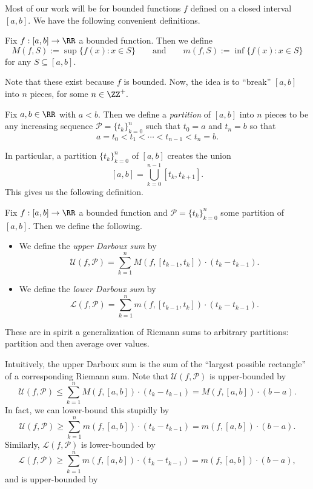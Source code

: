 \documentclass[../notes.tex]{subfiles}
\begin{document}
Most of our work will be for bounded functions $f$ defined on a closed interval $[a,b].$ We have the following convenient definitions.
\begin{definition}
	Fix $f:[a,b]\to\RR$ a bounded function. Then we define
	\[M(f,S):=\sup\{f(x):x\in S\}\qquad\text{and}\qquad m(f,S):=\inf\{f(x):x\in S\}\]
	for any $S\subseteq[a,b].$
\end{definition}
Note that these exist because $f$ is bounded. Now, the idea is to ``break'' $[a,b]$ into $n$ pieces, for some $n\in\ZZ^+.$
\begin{definition}[Partition]
	Fix $a,b\in\RR$ with $a<b.$ Then we define a \textit{partition} of $[a,b]$ into $n$ pieces to be any increasing sequence $\mathcal P=\{t_k\}_{k=0}^n$ such that $t_0=a$ and $t_n=b$ so that
	\[a=t_0<t_1<\cdots<t_{n-1}<t_n=b.\]
\end{definition}
In particular, a partition $\{t_k\}_{k=0}^n$ of $[a,b]$ creates the union
\[[a,b]=\bigcup_{k=0}^{n-1}[t_k,t_{k+1}].\]
This gives us the following definition.
\begin{definition}
	Fix $f:[a,b]\to\RR$ a bounded function and $\mathcal P=\{t_k\}_{k=0}^n$ some partition of $[a,b].$ Then we define the following.
	\begin{itemize}
		\item We define the \textit{upper Darboux sum} by
		\[\mathcal U(f,\mathcal P)=\sum_{k=1}^nM(f,[t_{k-1},t_k])\cdot(t_k-t_{k-1}).\]
		\item We define the \textit{lower Darboux sum} by
		\[\mathcal L(f,\mathcal P)=\sum_{k=1}^nm(f,[t_{k-1},t_k])\cdot(t_k-t_{k-1}).\]
	\end{itemize}
\end{definition}
\begin{remark}
	These are in spirit a generalization of Riemann sums to arbitrary partitions: partition and then average over values.
\end{remark}
Intuitively, the upper Darboux sum is the sum of the ``largest possible rectangle'' of a corresponding Riemann sum. Note that $\mathcal U(f,\mathcal P)$ is upper-bounded by
\[\mathcal U(f,\mathcal P)\le\sum_{k=1}^nM(f,[a,b])\cdot(t_k-t_{k-1})=M(f,[a,b])\cdot(b-a).\]
In fact, we can lower-bound this stupidly by
\[\mathcal U(f,\mathcal P)\ge\sum_{k=1}^nm(f,[a,b])\cdot(t_k-t_{k-1})=m(f,[a,b])\cdot(b-a).\]
Similarly, $\mathcal L(f,\mathcal P)$ is lower-bounded by
\[\mathcal L(f,\mathcal P)\ge\sum_{k=1}^nm(f,[a,b])\cdot(t_k-t_{k-1})=m(f,[a,b])\cdot(b-a),\]
and is upper-bounded by
\end{document}
